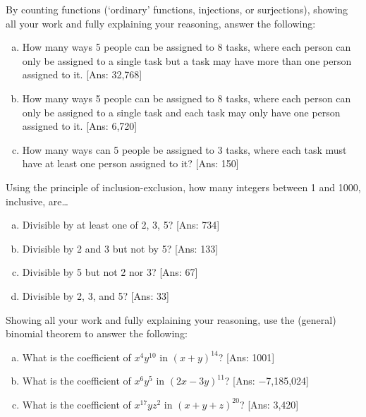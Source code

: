 \documentclass[11pt,letterpaper]{article}
\begin{document}

 By counting functions (`ordinary' functions, injections, or surjections), showing all your work and fully explaining your reasoning, answer the following:
	\begin{enumerate}[(a)]
	\item How many ways 5 people can be assigned to 8 tasks, where each person can only be assigned to a single task but a task may have more than one person assigned to it. [Ans: 32,768]
	\item How many ways 5 people can be assigned to 8 tasks, where each person can only be assigned to a single task and each task may only have one person assigned to it. [Ans: 6,720]
	\item How many ways can 5 people be assigned to 3 tasks, where each task must have at least one person assigned to it? [Ans: 150]
	\end{enumerate}



\newpage



 Using the principle of inclusion-exclusion, how many integers between 1 and 1000, inclusive, are\dots
	\begin{enumerate}[(a)]
	\item Divisible by at least one of 2, 3, 5? [Ans: 734]
	\item Divisible by 2 and 3 but not by 5? [Ans: 133]
	\item Divisible by 5 but not 2 nor 3? [Ans: 67]
	\item Divisible by 2, 3, and 5? [Ans: 33]
	\end{enumerate}



\newpage



 Showing all your work and fully explaining your reasoning, use the (general) binomial theorem to answer the following:
	\begin{enumerate}[(a)]
	\item What is the coefficient of $x^4 y^{10}$ in $(x + y)^{14}$? [Ans: 1001]
	\item What is the coefficient of $x^6 y^5$ in $(2x - 3y)^{11}$? [Ans: $-$7,185,024]
	\item What is the coefficient of $x^{17} y z^2$ in $(x + y + z)^{20}$? [Ans: 3,420]
	\end{enumerate}
\end{document}
